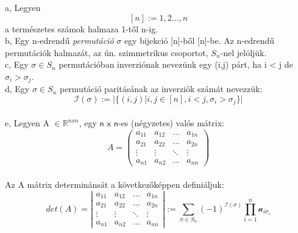\documentclass{article}
\begin{document}
a, Legyen \[[n]:={1,2...,n}\]
a természetes számok halmaza 1-től n-ig.
\\b, Egy n-edrendű \textit{permutáció} $\sigma$ egy bijekció [n]-ből [n]-be. Az n-edrendű permutációk halmazát, az ún. szimmetrikus csoportot, $S_{n}$-nel jelöljük.
\\c, Egy $\sigma\in S_n$ permutációban inverziónak nevezünk egy (i,j) párt, ha i < j de $\sigma_{i} > \sigma_{j}$.
\\d, Egy $\sigma\in S_n$ permutáció paritásának az inverziók számát nevezzük: \[\mathcal{I}(\sigma):=\big|\{(i,j)|i,j\in [n], i<j,\sigma_{i}>\sigma_{j}\}\big|\]
\\e, Legyen A $\in \mathbb{R}^{nxn}$, egy $\mathsf{n}$ $\mathsf{x}$ $\mathsf{n}$-es (négyzetes) valós mátrix: \[A= \left(
\begin{matrix}
a_{11} & a_{12} & ... & a_{1n} \\
a_{21} & a_{22} & ... & a_{2n} \\
\vdots & \vdots & \ddots & \vdots \\
a_{n1} & a_{n2} & ... & a_{nn}
\end{matrix}\right)\]
\\Az A mátrix determinánsát a következőképpen definiáljuk: \[det(A)=\left|
\begin{matrix}
a_{11} & a_{12} & ... & a_{1n} \\
a_{21} & a_{22} & ... & a_{2n} \\
\vdots & \vdots & \ddots & \vdots \\
a_{n1} & a_{n2} & ... & a_{nn}
\end{matrix}\right|:=\sum_{\sigma\in S_n}(-1)^{\mathcal{I}(\sigma)}\prod_{i=1}^{n}\mathcal{a}_{i\sigma_i}\]
\end{document}
